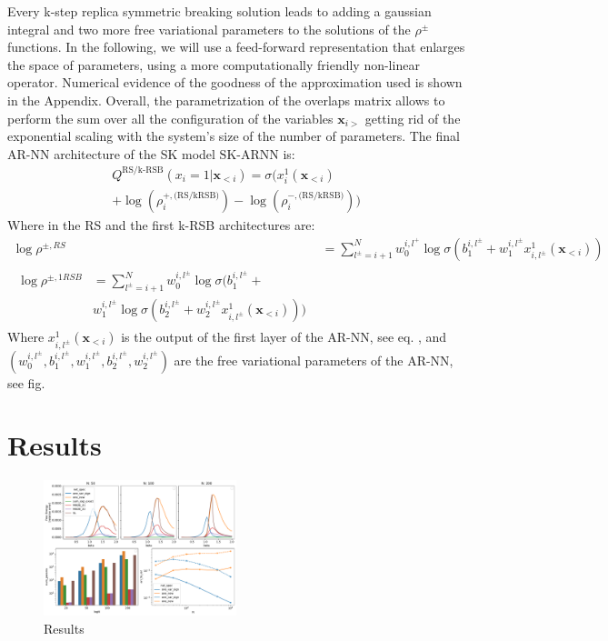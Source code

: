 \documentclass[aps,physrev,10pt,floatfix,reprint]{revtex4-2}
\begin{document}
Every k-step replica symmetric breaking solution leads to adding a gaussian integral and two more free variational parameters to the solutions of the $\rho^{\pm}$ functions. 
In the following, we will use a feed-forward representation that enlarges the space of parameters, using a more computationally friendly non-linear operator. 
Numerical evidence of the goodness of the approximation used is shown in the Appendix. 
Overall, the parametrization of the overlaps matrix allows to perform the sum over all the configuration of the variables $\mathbf{x}_{i>}$ getting rid of the exponential scaling with the system's size of the number of parameters. 
The final AR-NN architecture of the SK model $\text{SK-ARNN}$ is: 
\begin{multline}
    Q^{\text{RS/k-RSB}}\left(x_{i}=1|\mathbf{x}_{<i}\right) = \sigma\bigg( 
        x_i^1(\mathbf{x}_{<i}) \\
        +\log(\rho_i^{+, \text{(RS/kRSB)}}) -
         \log(\rho_i^{-, \text{(RS/kRSB)}})
    \bigg)  
\end{multline}
Where in the RS and the first k-RSB architectures are:
\begin{align*}
    \log \rho^{\pm, RS} & = \sum_{l^{\pm}=i+1}^{N}  w_0^{i,l^+} \log \sigma(b_1^{i,l^{\pm}} +
w_1^{i,l^{\pm}} x_{i,l^{\pm}}^1(\mathbf{x}_{<i})) \\
\begin{split}
    \log \rho^{\pm, 1RSB} & = 
    \sum_{l^{\pm}=i+1}^{N}  w_0^{i,l^{\pm}} \log\sigma(b_1^{i,l^{\pm}} + \\
    &  w_1^{i,l^{\pm}} \log\sigma(b_2^{i,l^{\pm}} +  w_2^{i,l^{\pm}}  x_{i,l^{\pm}}^1(\mathbf{x}_{<i}))) 
    \end{split}
\end{align*}
Where $x_{i,l^{\pm}}^1(\mathbf{x}_{<i})$ is the output of the first layer of the AR-NN, see eq. , and $(w_0^{i,l^{\pm}}, b_1^{i,l^{\pm}}, w_1^{i,l^{\pm}}, b_2^{i,l^{\pm}}, w_2^{i,l^{\pm}})$ are the free variational parameters of the AR-NN, see fig.

\section{Results}

\begin{figure}[!h]
    \centering
    \includegraphics[width=0.5\textwidth]{img/CW_res.pdf}
    \caption{Results}
    \label{fig:curie_weiss}
\end{figure}
\end{document}
